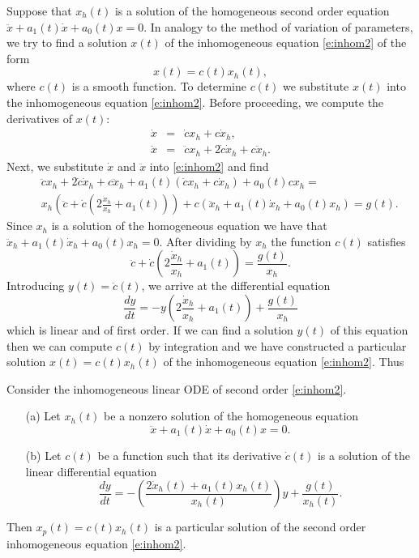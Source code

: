 \documentclass{ximera}
\begin{document}
Suppose that $x_h(t)$ is a solution of the 
homogeneous second order equation
$\ddot{x} + a_1(t)\dot{x} + a_0(t)x = 0$.  
In analogy to the method of variation of
parameters, we try to find a solution $x(t)$ of the 
inhomogeneous equation
\eqref{e:inhom2} of the form
\[
x(t) = c(t) x_h(t),
\]
where $c(t)$ is a smooth function.  To determine $c(t)$ we substitute $x(t)$
into the inhomogeneous equation \eqref{e:inhom2}.  Before proceeding, we
compute the derivatives of $x(t)$:
\begin{eqnarray*}
\dot x  & = & \dot c x_h + c \dot{x}_h,\\
\ddot x & = & \ddot c x_h + 2 \dot c \dot{x}_h + c \ddot{x}_h.
\end{eqnarray*}
Next, we substitute $\dot{x}$ and $\ddot{x}$ into \eqref{e:inhom2} and find
\begin{eqnarray*}
&& \ddot c x_h +2\dot c \dot{x}_h + c \ddot{x}_h +
a_1(t)\left(\dot c x_h + c \dot{x}_h \right)+ a_0(t) c x_h =\\
&& x_h \left(\ddot c + \dot c(2 \frac{\dot{x}_h}{x_h} + a_1(t))\right) +
 c(\ddot{x}_h +a_1(t) \dot{x}_h +a_0(t) x_h) = g(t).
\end{eqnarray*}
Since $x_h$ is a solution of the homogeneous equation we have that
$\ddot{x}_h +a_1(t) \dot{x}_h +a_0(t)x_h=0$. After dividing by $x_h$ the function
$c(t)$ satisfies
\[
\ddot c + \dot c\left( 2\frac{\dot{x}_h}{x_h} +a_1(t)\right) = \frac{g(t)}{x_h}.
\]
Introducing $y(t)=\dot c(t)$, we arrive at the differential equation
\[
\frac{dy}{dt} = -y\left( 2\frac{\dot{x}_h}{x_h} +a_1(t)\right) + \frac{g(t)}{x_h}
\]
which is linear and of first order.  If we can find a solution
$y(t)$ of this equation then we can compute $c(t)$ by integration
and we have constructed a 
particular solution 
$x(t)=c(t)x_h(t)$ of the
inhomogeneous equation \eqref{e:inhom2}. Thus
\begin{theorem}  \label{thm:redord}
Consider the inhomogeneous linear ODE of second order \eqref{e:inhom2}.
\begin{itemize}
\item[(a)] Let $x_h(t)$ be a nonzero solution of the homogeneous equation
\[
\ddot{x} + a_1(t)\dot{x} + a_0(t)x = 0.
\]
\item[(b)] Let $c(t)$ be a function such that its derivative 
$\dot c(t)$ is a solution of the linear differential equation
\begin{equation}  \label{eq:ro}
\frac{dy}{dt} = -\left(\frac{2\dot x_h(t)+a_1(t) x_h(t)}{x_h(t)}\right)y
+\frac{g(t)}{x_h(t)}.
\end{equation}
\end{itemize}
Then $x_p(t)=c(t) x_h(t)$ is a particular 
solution of the second
order inhomogeneous equation \eqref{e:inhom2}.
\end{theorem}
\end{document}
